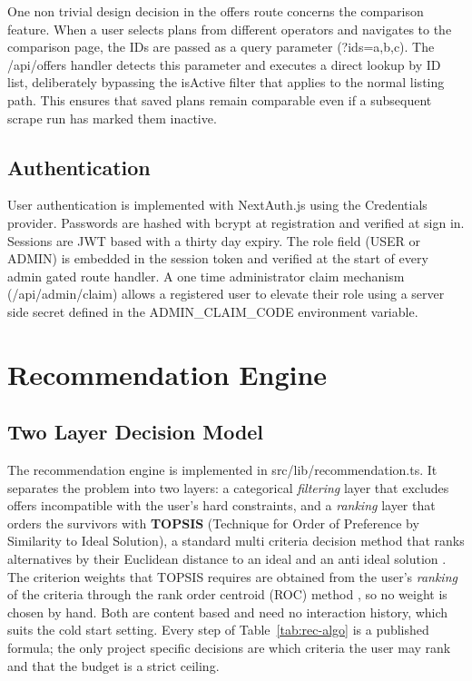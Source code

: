 One non trivial design decision in the offers route concerns the comparison feature. When a user selects plans from different operators and navigates to the comparison page, the IDs are passed as a query parameter (?ids=a,b,c). The /api/offers handler detects this parameter and executes a direct lookup by ID list, deliberately bypassing the isActive filter that applies to the normal listing path. This ensures that saved plans remain comparable even if a subsequent scrape run has marked them inactive.

\subsection{Authentication}

User authentication is implemented with NextAuth.js using the Credentials provider. Passwords are hashed with bcrypt at registration and verified at sign in. Sessions are JWT based with a thirty day expiry. The role field (USER or ADMIN) is embedded in the session token and verified at the start of every admin gated route handler. A one time administrator claim mechanism (/api/admin/claim) allows a registered user to elevate their role using a server side secret defined in the ADMIN\_CLAIM\_CODE environment variable.

\section{Recommendation Engine}

\subsection{Two Layer Decision Model}

The recommendation engine is implemented in src/lib/recommendation.ts. It separates the problem into two layers: a categorical \emph{filtering} layer that excludes offers incompatible with the user's hard constraints, and a \emph{ranking} layer that orders the survivors with \textbf{TOPSIS} (Technique for Order of Preference by Similarity to Ideal Solution), a standard multi criteria decision method that ranks alternatives by their Euclidean distance to an ideal and an anti ideal solution \parencite{HwangYoon1981, TaherdoostMadanchian2023}. The criterion weights that TOPSIS requires are obtained from the user's \emph{ranking} of the criteria through the rank order centroid (ROC) method \parencite{BarronBarrett1996}, so no weight is chosen by hand. Both are content based and need no interaction history, which suits the cold start setting. Every step of Table~\ref{tab:rec-algo} is a published formula; the only project specific decisions are which criteria the user may rank and that the budget is a strict ceiling.

